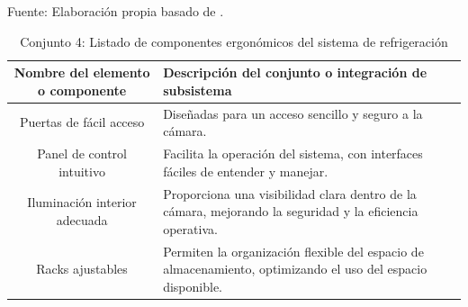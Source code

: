\begin{table}[H]
	\centering
	\caption{Conjunto 4: Listado de componentes ergonómicos del sistema de refrigeración}
	Fuente: Elaboración propia basado de .
	\begin{tabular}{@{}cl@{}}
		\toprule
		\begin{minipage}[t]{0.25\linewidth}\textbf{Nombre del elemento o componente}\end{minipage} & \begin{minipage}[t]{0.60\linewidth}\textbf{Descripción del conjunto o integración de subsistema}\end{minipage} \\ \midrule
		Puertas de fácil acceso                   & \begin{minipage}[t]{0.6\linewidth}Diseñadas para un acceso sencillo y seguro a la cámara.\end{minipage} \\
		Panel de control intuitivo                & \begin{minipage}[t]{0.6\linewidth}Facilita la operación del sistema, con interfaces fáciles de entender y manejar.\end{minipage} \\
		Iluminación interior adecuada             & \begin{minipage}[t]{0.6\linewidth}Proporciona una visibilidad clara dentro de la cámara, mejorando la seguridad y la eficiencia operativa.\end{minipage} \\
		Racks ajustables                          & \begin{minipage}[t]{0.6\linewidth}Permiten la organización flexible del espacio de almacenamiento, optimizando el uso del espacio disponible.\end{minipage} \\ \bottomrule
	\end{tabular}
	\label{tabla:ergonomia}
\end{table}
















































